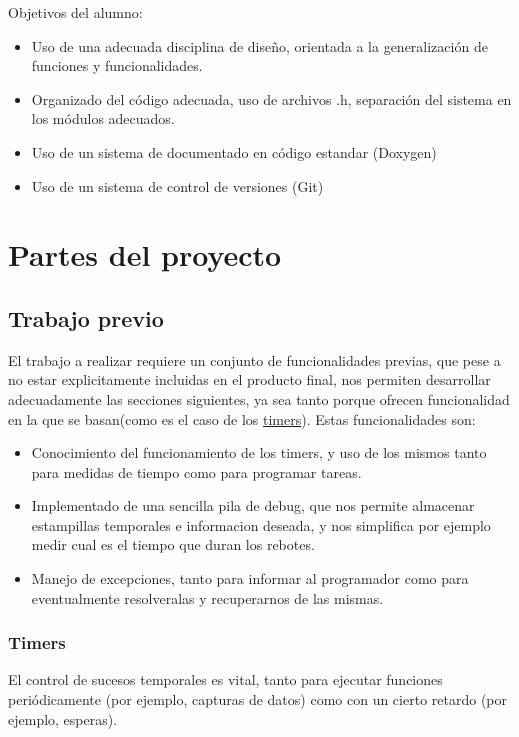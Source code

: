 \documentclass[12pt,letterpaper]{article}
\begin{document}
Objetivos del alumno:
\begin{itemize}
  \item Uso de una adecuada disciplina de diseño, orientada a la
    generalización de funciones y funcionalidades.
  \item Organizado del código adecuada, uso de archivos .h, separación
    del sistema en los módulos adecuados.
  \item Uso de un sistema de documentado en código estandar (Doxygen)
  \item Uso de un sistema de control de versiones (Git)
\end{itemize}

\section{Partes del proyecto}
\label{sec:partes}

\subsection{Trabajo previo}
\label{subsec:previous}

El trabajo a realizar requiere un conjunto de funcionalidades previas,
que pese a no estar explicitamente incluidas en el producto final, nos
permiten desarrollar adecuadamente las secciones siguientes, ya sea
tanto porque ofrecen funcionalidad en la que se basan(como es el caso
de los \hyperref[subsubsec:timers]{timers}). Estas funcionalidades
son:
\begin{itemize}
  \item Conocimiento del funcionamiento de los timers, y uso de los
    mismos tanto para medidas de tiempo como para programar tareas.
  \item Implementado de una sencilla pila de debug, que nos permite
    almacenar estampillas temporales e informacion deseada, y nos
    simplifica por ejemplo medir cual es el tiempo que duran los
    rebotes.
  \item Manejo de excepciones, tanto para informar al programador como
    para eventualmente resolveralas y recuperarnos de las mismas.
\end{itemize}

\subsubsection{Timers}
\label{subsubsec:timers}
El control de sucesos temporales es vital, tanto para ejecutar
funciones periódicamente (por ejemplo, capturas de datos) como con un
cierto retardo (por ejemplo, esperas).
\end{document}
